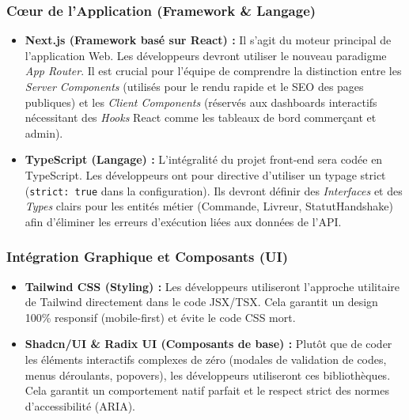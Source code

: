 \subsubsection{Cœur de l'Application (Framework \& Langage)}
\begin{itemize}
    \item \textbf{Next.js (Framework basé sur React) :} Il s'agit du moteur principal de l'application Web. Les développeurs devront utiliser le nouveau paradigme \textit{App Router}. Il est crucial pour l'équipe de comprendre la distinction entre les \textit{Server Components} (utilisés pour le rendu rapide et le SEO des pages publiques) et les \textit{Client Components} (réservés aux dashboards interactifs nécessitant des \textit{Hooks} React comme les tableaux de bord commerçant et admin).
    \item \textbf{TypeScript (Langage) :} L'intégralité du projet front-end sera codée en TypeScript. Les développeurs ont pour directive d'utiliser un typage strict (\texttt{strict: true} dans la configuration). Ils devront définir des \textit{Interfaces} et des \textit{Types} clairs pour les entités métier (Commande, Livreur, StatutHandshake) afin d'éliminer les erreurs d'exécution liées aux données de l'API.
\end{itemize}

\subsubsection{Intégration Graphique et Composants (UI)}
\begin{itemize}
    \item \textbf{Tailwind CSS (Styling) :} Les développeurs utiliseront l'approche utilitaire de Tailwind directement dans le code JSX/TSX. Cela garantit un design 100\% responsif (mobile-first) et évite le code CSS mort.
    \item \textbf{Shadcn/UI \& Radix UI (Composants de base) :} Plutôt que de coder les éléments interactifs complexes de zéro (modales de validation de codes, menus déroulants, popovers), les développeurs utiliseront ces bibliothèques. Cela garantit un comportement natif parfait et le respect strict des normes d'accessibilité (ARIA).
\end{itemize}

